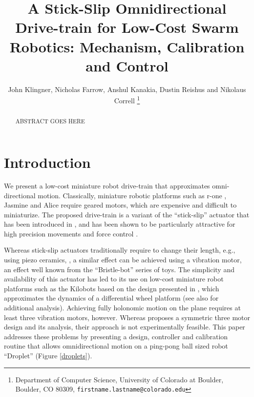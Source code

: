 \documentclass[letterpaper, 10pt, conference]{ieeeconf}
\title{\LARGE \bf
A Stick-Slip Omnidirectional Drive-train for Low-Cost Swarm Robotics: Mechanism, Calibration and Control
}
\author{John Klingner, Nicholas Farrow, Anshul Kanakia, Dustin Reishus and Nikolaus Correll%
\thanks{Department of Computer Science,
University of Colorado at Boulder,
 Boulder, CO 80309,
{\tt\small firstname.lastname{@}colorado.edu}}%
}
\begin{document}
\maketitle


\begin{abstract}
ABSTRACT GOES HERE
\end{abstract}



\section{Introduction}
We present a low-cost miniature robot drive-train that approximates omni-directional motion. Classically, miniature robotic platforms such as r-one \cite{mclurkin2013low}, Jasmine \cite{jasmine} and Alice \cite{alice} require geared motors, which are expensive and difficult to miniaturize. The proposed drive-train is a variant of the ``stick-slip'' actuator that has been introduced in \cite{breguet1998stick}, and has been shown to be particularly attractive for high precision movements \cite{brufau2005micron,chu2006novel,martel2001three,martel2005fundamental,eigoli2012locomotion} and force control \cite{vartholomeos2008analysis}.   

Whereas stick-slip actuators traditionally require to change their length, e.g., using piezo ceramics,  \cite{breguet1998stick, martel2005fundamental}, a similar effect can be achieved using a vibration motor, an effect well known from the ``Bristle-bot'' series of toys. The simplicity and availability of this actuator  has led to its use on low-cost miniature robot platforms such as the Kilobots \cite{rubenstein2012kilobot} based on the design presented in \cite{Vartholomeos2006}, which approximates the dynamics of a differential wheel platform (see also \cite{spartali2013speed} for additional analysis). Achieving fully holonomic motion on the plane requires at least three vibration motors, however. Whereas \cite{Vartholomeos2005} proposes a symmetric three motor design and its analysis, their approach is not experimentally feasible. This paper addresses these problems by presenting a design, controller and calibration routine that allows omnidirectional motion on a ping-pong ball sized robot ``Droplet'' (Figure \ref{droplets}).
\end{document}
